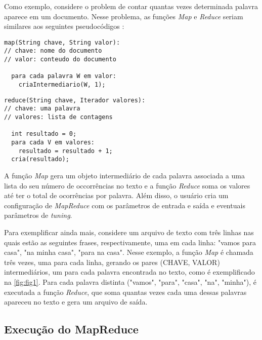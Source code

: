 Como exemplo, considere o problem de contar quantas vezes determinada palavra aparece em um documento. Nesse problema, as funções \textit{Map} e \textit{Reduce} seriam similares aos seguintes pseudocódigos \cite{MapReduce08}:

\begin{lstlisting}[caption={Exemplo de função Map em pseudocódigo adaptado de \cite{MapReduce08}}, label=code:codigo1]
map(String chave, String valor):
// chave: nome do documento
// valor: conteudo do documento

  para cada palavra W em valor:
    criaIntermediario(W, 1);
\end{lstlisting}

\newpage
\begin{lstlisting}[caption={Exemplo de função Reduce em pseudocódigo adaptado de \cite{MapReduce08}}, label=code:codigo2]
reduce(String chave, Iterador valores):
// chave: uma palavra
// valores: lista de contagens

  int resultado = 0;
  para cada V em valores:
    resultado = resultado + 1;
  cria(resultado);
\end{lstlisting}

A função \textit{Map} gera um objeto intermediário de cada palavra associada a uma lista do seu número de occorrências no texto e a função \textit{Reduce} soma os valores até ter o total de ocorrências por palavra. Além disso, o usuário cria um configuração de \textit{MapReduce} com os parâmetros de entrada e saída e eventuais parâmetros de \textit{tuning}.

Para exemplificar ainda mais, considere um arquivo de texto com três linhas nas quais estão as seguintes frases, respectivamente, uma em cada linha: "vamos para casa", "na minha casa", "para na casa". Nesse exemplo, a função \textit{Map} é chamada três vezes, uma para cada linha, gerando os pares (CHAVE, VALOR) intermediários, um para cada palavra encontrada no texto, como é exemplificado na \autoref{fig:fig1}. Para cada palavra distinta ("vamos", "para", "casa", "na", "minha"), é executada a função \textit{Reduce}, que soma quantas vezes cada uma dessas palavras apareceu no texto e gera um arquivo de saída.


\subsection{Execução do MapReduce}\label{ssec:execucaomapreduce}

